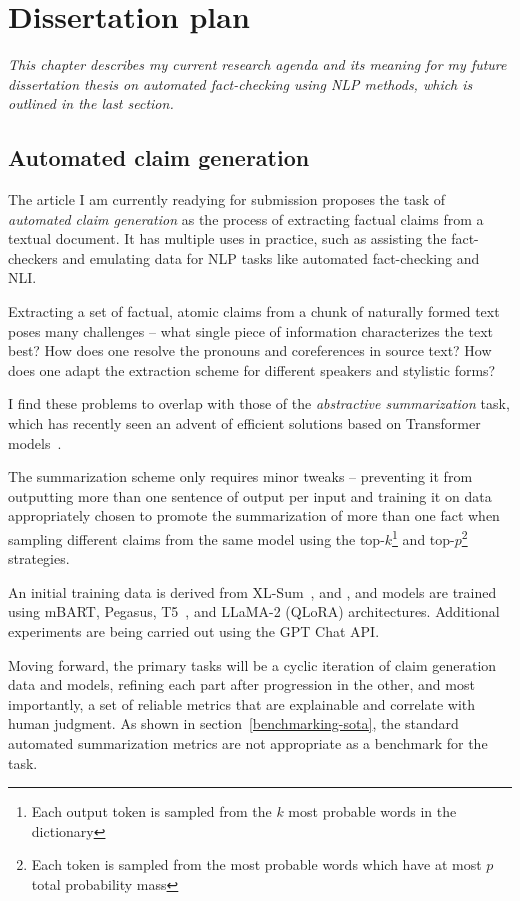 
\chapter{Dissertation plan}
\label{chap:plan}
\textit{This chapter describes my current research agenda and its meaning for my future dissertation thesis on automated fact-checking using NLP methods, which is outlined in the last section.}

\section{Automated claim generation}
\label{generation}

The article I am currently readying for submission proposes the task of \textit{automated claim generation} as the process of extracting factual claims from a textual document. It has multiple uses in practice, such as assisting the fact-checkers and emulating data for NLP tasks like automated fact-checking and NLI.

Extracting a set of factual, atomic claims from a chunk of naturally formed text poses many challenges -- what single piece of information characterizes the text best? 
How does one resolve the pronouns and coreferences in source text?
How does one adapt the extraction scheme for different speakers and stylistic forms?

I find these problems to overlap with those of the \textit{abstractive summarization} task, which has recently seen an advent of efficient solutions based on Transformer models~\cite{pegasus, brio}.

The summarization scheme only requires minor tweaks -- preventing it from outputting more than one sentence of output per input and training it on data appropriately chosen to promote the summarization of more than one fact when sampling different claims from the same model using the top-$k$\footnote{Each output token is sampled from the $k$ most probable words in the dictionary} and top-$p$\footnote{Each token is sampled from the most probable words which have at most $p$ total probability mass}~\cite{topp} strategies.

An initial training data is derived from XL-Sum~\cite{xlsum}, \FEN and \CTK, and models are trained using mBART, Pegasus, T5~\cite{t5-11b}, and LLaMA-2 (QLoRA) architectures.  Additional experiments are being carried out using the GPT Chat API.

Moving forward, the primary tasks will be a cyclic iteration of claim generation data and models, refining each part after progression in the other, and most importantly, a set of reliable metrics that are explainable and correlate with human judgment.
As shown in section~\ref{benchmarking-sota}, the standard automated summarization metrics are not appropriate as a benchmark for the task.

